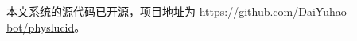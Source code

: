 
\begin{thesisappendix}
本文系统的源代码已开源，项目地址为 \url{https://github.com/DaiYuhao-bot/physlucid}。
\end{thesisappendix}
